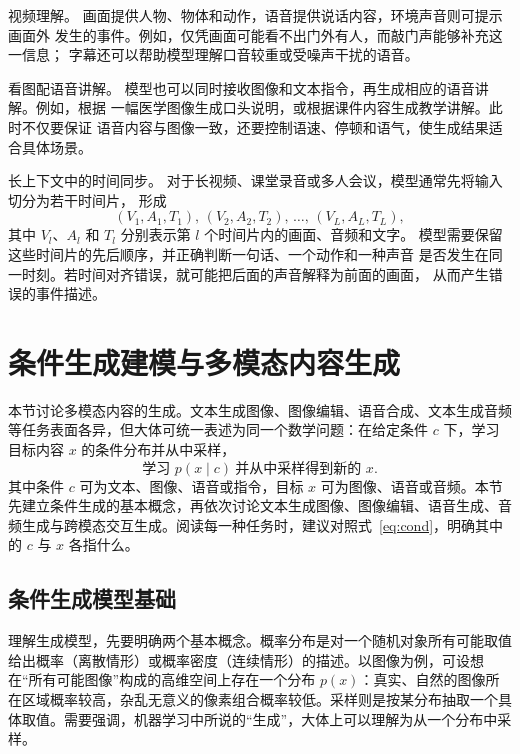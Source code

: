视频理解。
画面提供人物、物体和动作，语音提供说话内容，环境声音则可提示画面外
发生的事件。例如，仅凭画面可能看不出门外有人，而敲门声能够补充这一信息；
字幕还可以帮助模型理解口音较重或受噪声干扰的语音。

看图配语音讲解。
模型也可以同时接收图像和文本指令，再生成相应的语音讲解。例如，根据
一幅医学图像生成口头说明，或根据课件内容生成教学讲解。此时不仅要保证
语音内容与图像一致，还要控制语速、停顿和语气，使生成结果适合具体场景。

长上下文中的时间同步。
对于长视频、课堂录音或多人会议，模型通常先将输入切分为若干时间片，
形成
\[
  (V_1,A_1,T_1),\,
  (V_2,A_2,T_2),\,
  \ldots,\,
  (V_L,A_L,T_L),
\]
其中 $V_l$、$A_l$ 和 $T_l$ 分别表示第 $l$ 个时间片内的画面、音频和文字。
模型需要保留这些时间片的先后顺序，并正确判断一句话、一个动作和一种声音
是否发生在同一时刻。若时间对齐错误，就可能把后面的声音解释为前面的画面，
从而产生错误的事件描述。


\section{条件生成建模与多模态内容生成}
\label{sec:generation}

本节讨论多模态内容的生成。文本生成图像、图像编辑、语音合成、文本生成音频等任务表面各异，但大体可统一表述为同一个数学问题：在给定条件 $c$ 下，学习目标内容 $x$ 的条件分布并从中采样，
\begin{equation}
  \text{学习 } p(x\mid c)\ \text{并从中采样得到新的 } x .
  \label{eq:cond}
\end{equation}
其中条件 $c$ 可为文本、图像、语音或指令，目标 $x$ 可为图像、语音或音频。本节先建立条件生成的基本概念，再依次讨论文本生成图像、图像编辑、语音生成、音频生成与跨模态交互生成。阅读每一种任务时，建议对照式~\eqref{eq:cond}，明确其中的 $c$ 与 $x$ 各指什么。

\subsection{条件生成模型基础}
\label{sub:genbasic}

理解生成模型，先要明确两个基本概念。概率分布是对一个随机对象所有可能取值给出概率（离散情形）或概率密度（连续情形）的描述。以图像为例，可设想在“所有可能图像”构成的高维空间上存在一个分布 $p(x)$：真实、自然的图像所在区域概率较高，杂乱无意义的像素组合概率较低。采样则是按某分布抽取一个具体取值。需要强调，机器学习中所说的“生成”，大体上可以理解为从一个分布中采样。

